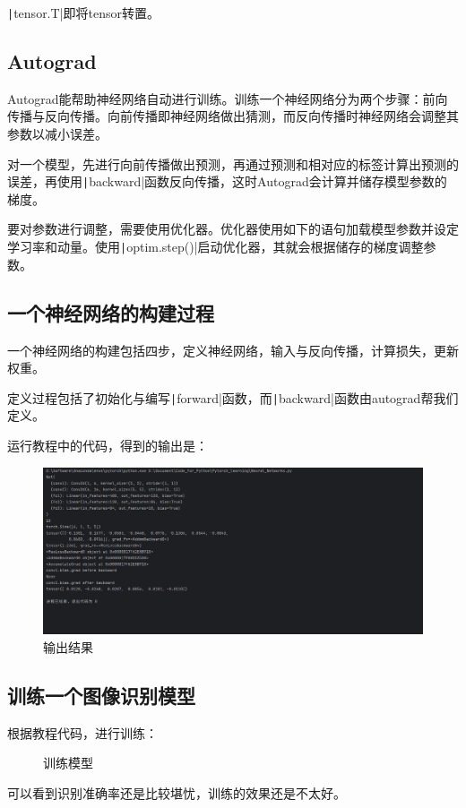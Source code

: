 \documentclass[fontset=ubuntu]{ctexart}
\begin{document}
\texttt|tensor.T|即将tensor转置。

\subsection{Autograd}
Autograd能帮助神经网络自动进行训练。训练一个神经网络分为两个步骤：前向传播与反向传播。向前传播即神经网络做出猜测，而反向传播时神经网络会调整其参数以减小误差。

对一个模型，先进行向前传播做出预测，再通过预测和相对应的标签计算出预测的误差，再使用\texttt|backward|函数反向传播，这时Autograd会计算并储存模型参数的梯度。

要对参数进行调整，需要使用优化器。优化器使用如下的语句加载模型参数并设定学习率和动量。使用\texttt|optim.step()|启动优化器，其就会根据储存的梯度调整参数。

\subsection{一个神经网络的构建过程}
一个神经网络的构建包括四步，定义神经网络，输入与反向传播，计算损失，更新权重。

定义过程包括了初始化与编写\texttt|forward|函数，而\texttt|backward|函数由autograd帮我们定义。

运行教程中的代码，得到的输出是：
\begin{figure}
    \centering
    \includegraphics[width=0.75\linewidth]{PyTorch_1.png}
    \caption{输出结果}
    \label{fig:PyTorch_1}
\end{figure}

\subsection{训练一个图像识别模型}
根据教程代码，进行训练：
\begin{figure}[htb]
    \centering
    \caption{训练模型}
    \label{PyTorch}
\end{figure}

可以看到识别准确率还是比较堪忧，训练的效果还是不太好。
\end{document}
